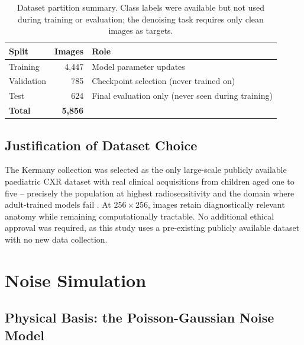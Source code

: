 \documentclass[12pt, a4paper, twoside, openright]{book}
\begin{document}
\begin{table}[htbp]
\centering
\caption{Dataset partition summary. Class labels were available but not used during
training or evaluation; the denoising task requires only clean images as targets.}
\label{tab:methods:dataset}
\begin{tabular}{lrl}
\toprule
\textbf{Split} & \textbf{Images} & \textbf{Role} \\
\midrule
Training & 4,447 & Model parameter updates \\
Validation & 785 & Checkpoint selection (never trained on) \\
Test & 624 & Final evaluation only (never seen during training) \\
\midrule
\textbf{Total} & \textbf{5,856} & \\
\bottomrule
\end{tabular}
\end{table}

\subsection{Justification of Dataset Choice}
\label{sec:methods:dataset:justification}

The Kermany collection was selected as the only large-scale publicly available paediatric CXR dataset with real clinical acquisitions from children aged one to five -- precisely the population at highest radiosensitivity \cite{smith-bindman_hematologic_2025} and the domain where adult-trained models fail \cite{laborie_scoping_2026}. At $256\times256$, images retain diagnostically relevant anatomy while remaining computationally tractable. No additional ethical approval was required, as this study uses a pre-existing publicly available dataset with no new data collection.

\section{Noise Simulation}
\label{sec:methods:noise}

\subsection{Physical Basis: the Poisson-Gaussian Noise Model}
\label{sec:methods:noise:model}
\end{document}
